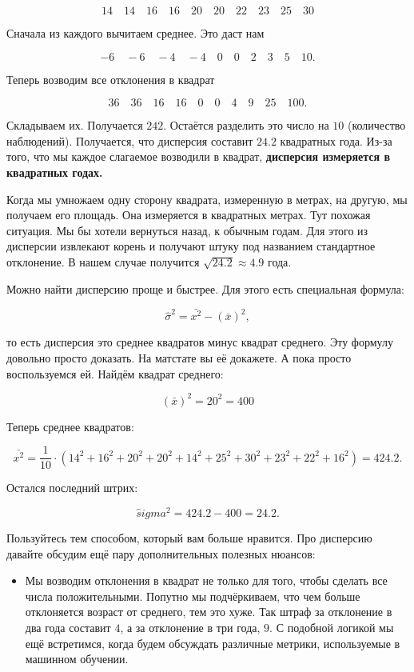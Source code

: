 \documentclass[12pt, a4paper, oneside]{article}
\theoremstyle{plain} %
\theoremstyle{definition}
\newcommand{\indef}[1]{\textbf{ \color{green} #1}}
\begin{document}
\begin{solution}
\begin{enumerate}
	\[
	14 \quad 14  \quad 16  \quad 16  \quad 20  \quad 20  \quad 22  \quad 23  \quad 25  \quad 30
	\]
	
	Сначала из каждого вычитаем среднее. Это даст нам
	
	\[
	-6 \quad -6  \quad -4  \quad -4  \quad 0  \quad 0 \quad 2  \quad 3  \quad 5  \quad 10.
	\]
	
	Теперь возводим все отклонения в квадрат
	
	\[
	36 \quad 36  \quad 16  \quad 16 \quad 0  \quad 0 \quad 4  \quad 9 \quad 25  \quad 100.
	\]
	
	Складываем их.  Получается $242$. Остаётся разделить это число на  $10$ (количество наблюдений). Получается, что дисперсия составит $24.2$ квадратных года.  Из-за того, что мы каждое слагаемое возводили в квадрат, \indef{дисперсия измеряется в квадратных годах.}
	
	Когда мы умножаем одну сторону квадрата, измеренную в метрах, на другую, мы получаем его площадь. Она измеряется в квадратных метрах. Тут похожая ситуация. Мы бы хотели вернуться назад, к обычным годам. Для этого из дисперсии извлекают корень и получают штуку под названием стандартное отклонение. В нашем случае получится $\sqrt{24.2} \approx 4.9$ года. 
	
	
	Можно найти дисперсию проще и быстрее. Для этого есть специальная формула: 

	$$
	\hat \sigma^2 = \bar{x^2} - (\bar x)^2,
	$$
	
	то есть дисперсия это среднее квадратов минус квадрат среднего. Эту формулу довольно просто доказать. На матстате вы её докажете. А пока просто воспользуемся ей. Найдём квадрат среднего:
	
	$$
	(\bar x)^2 = 20^2 = 400
	$$
	
	Теперь среднее квадратов: 
	
	$$
	\bar{x^2} = \frac{1}{10} \cdot (14^2 + 16^2 + 20^2 + 20^2 + 14^2 + 25^2 + 30^2 + 23^2 + 22^2 + 16^2) = 424.2.
	$$
	
	Остался последний штрих: 
	
	$$
	\hat sigma^2 = 424.2 - 400 = 24.2.
	$$
	
	Пользуйтесь тем способом, который вам больше нравится. Про дисперсию давайте обсудим ещё пару дополнительных полезных нюансов: 
	
	\begin{itemize}
		\item  Мы возводим отклонения в квадрат не только для того, чтобы сделать все числа положительными. Попутно мы подчёркиваем, что чем больше отклоняется возраст от среднего, тем это хуже. Так штраф за отклонение в два года составит $4$, а за отклонение в три года, $9$.  С подобной логикой мы ещё встретимся, когда будем обсуждать различные метрики, используемые в машинном обучении. 
		

\end{itemize}
\end{enumerate}
\end{solution}
\end{document}
